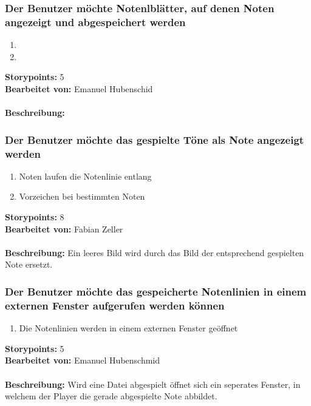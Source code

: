 \subsubsection{Der Benutzer möchte Notenlblätter, auf denen Noten angezeigt und abgespeichert werden}

\begin{enumerate}
 \item 
 \item 
 
\end{enumerate}

\textbf{Storypoints:} 5 \\
\textbf{Bearbeitet von:} Emanuel Hubenschid \\
\\
\textbf{Beschreibung:} 


\subsubsection{Der Benutzer möchte das gespielte Töne als Note angezeigt werden}

\begin{enumerate}
 \item Noten laufen die Notenlinie entlang
 \item Vorzeichen bei bestimmten Noten
\end{enumerate}

\textbf{Storypoints:} 8 \\
\textbf{Bearbeitet von:} Fabian Zeller \\
\\
\textbf{Beschreibung:} Ein leeres Bild wird durch das Bild der entsprechend gespielten Note ersetzt.


\subsubsection{Der Benutzer möchte das gespeicherte Notenlinien in einem externen Fenster aufgerufen 
werden können}

\begin{enumerate}
 \item Die Notenlinien  werden in einem externen Fenster geöffnet
\end{enumerate}

\textbf{Storypoints:} 5 \\
\textbf{Bearbeitet von:} Emanuel Hubenschmid \\
\\
\textbf{Beschreibung:} Wird eine Datei abgespielt öffnet sich ein seperates Fenster, in welchem der 
Player die gerade abgespielte Note abbildet.


